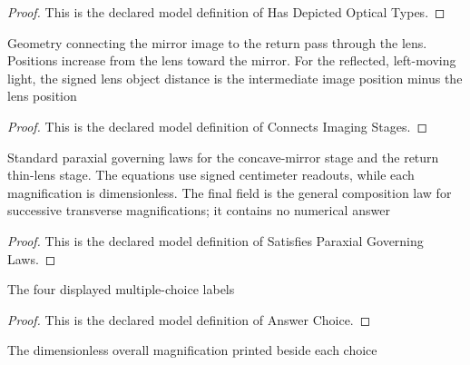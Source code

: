 \begin{proof}
  This is the declared model definition of Has Depicted Optical Types.
\end{proof}
\begin{definition}
  \label{def:physics:phyx-mini-0032:phyxminiproblems-problemphyxmini0032-connectsimagingstages}
  Geometry connecting the mirror image to the return pass through the lens. Positions increase from the lens toward the mirror. For the reflected, left-moving light, the signed lens object distance is the intermediate image position minus the lens position
\end{definition}
\begin{proof}
  This is the declared model definition of Connects Imaging Stages.
\end{proof}
\begin{definition}
  \label{def:physics:phyx-mini-0032:phyxminiproblems-problemphyxmini0032-satisfiesparaxialgoverninglaws}
  Standard paraxial governing laws for the concave-mirror stage and the return thin-lens stage. The equations use signed centimeter readouts, while each magnification is dimensionless. The final field is the general composition law for successive transverse magnifications; it contains no numerical answer
\end{definition}
\begin{proof}
  This is the declared model definition of Satisfies Paraxial Governing Laws.
\end{proof}
\begin{definition}
  \label{def:physics:phyx-mini-0032:phyxminiproblems-problemphyxmini0032-answerchoice}
  The four displayed multiple-choice labels
\end{definition}
\begin{proof}
  This is the declared model definition of Answer Choice.
\end{proof}
\begin{definition}
  \label{def:physics:phyx-mini-0032:phyxminiproblems-problemphyxmini0032-answermagnification}
  The dimensionless overall magnification printed beside each choice
\end{definition}
